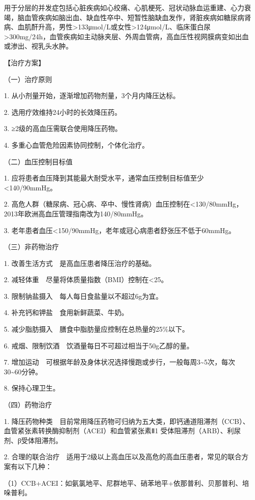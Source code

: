 用于分层的并发症包括心脏疾病如心绞痛、心肌梗死、冠状动脉血运重建、心力衰竭，脑血管疾病如脑出血、缺血性卒中、短暂性脑缺血发作，肾脏疾病如糖尿病肾病、血肌酐升高，男性\textgreater{}133μmol/L或女性\textgreater{}124μmol/L、临床蛋白尿\textgreater{}300mg/24h，血管疾病如主动脉夹层、外周血管病，高血压性视网膜病变如出血或渗出、视乳头水肿。

【治疗方案】

{（一）治疗原则}

1. 从小剂量开始，逐渐增加药物剂量，3个月内降压达标。

2. 选用疗效维持24小时的长效降压药。

3. ≥2级的高血压需联合使用降压药物。

4. 多重心血管危险因素协同控制，个体化治疗。

{（二）血压控制目标值}

1.
应将患者血压降到其能最大耐受水平，通常血压控制目标值至少\textless{}140/90mmHg。

2.
高危人群（糖尿病、冠心病、卒中、慢性肾病）血压控制在\textless{}130/80mmHg，2013年欧洲高血压管理指南改为140/80mmHg。

3.
老年患者血压\textless{}150/90mmHg，老年或冠心病患者舒张压不低于60mmHg。

{（三）非药物治疗}

1. 改善生活方式　是高血压患者降压治疗的基础。

2. 减轻体重　尽量将体质量指数（BMI）控制在\textless{}25。

3. 限制钠盐摄入　每人每日食盐量以不超过6g为宜。

4. 补充钙和钾盐　食用新鲜蔬菜、牛奶。

5. 减少脂肪摄入　膳食中脂肪量应控制在总热量的25\%以下。

6. 戒烟、限制饮酒　饮酒量每日不可超过相当于50g乙醇的量。

7.
增加运动　可根据年龄及身体状况选择慢跑或步行，一般每周3\textasciitilde{}5次，每次30\textasciitilde{}60分钟。

8. 保持心理卫生。

{（四）药物治疗}

1.
降压药物种类　目前常用降压药物可归纳为五大类，即钙通道阻滞剂（CCB）、血管紧张素转换酶抑制剂（ACEI）和血管紧张素Ⅱ{1}
受体阻滞剂（ARB）、利尿剂、β受体阻滞剂。

2.
合理的联合治疗　适用于2级以上高血压以及高危的高血压患者，常见的联合方案有以下几种：

（1）CCB+ACEI：如氨氯地平、尼群地平、硝苯地平+依那普利、贝那普利、培哚普利。

